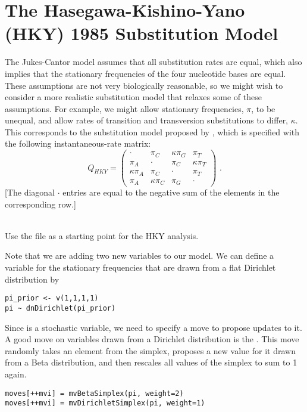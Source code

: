 \newpage
\section{The Hasegawa-Kishino-Yano (HKY) 1985 Substitution Model}

The Jukes-Cantor model assumes that all substitution rates are equal, which also implies that the stationary frequencies of the four nucleotide bases are equal.
These assumptions are not very biologically reasonable, so we might wish to consider a more realistic substitution model that relaxes some of these assumptions.
For example, we might allow stationary frequencies, $\pi$, to be unequal, and allow rates of transition and transversion substitutions to differ, $\kappa$.
This corresponds to the substitution model proposed by \citet[][HKY]{Hasegawa1985}, which is specified with the following instantaneous-rate matrix: 
\begin{equation*}
Q_{HKY} = \begin{pmatrix} 
{\cdot} 			& {\pi_C} 	& {\kappa\pi_G} 			& {\pi_T} \\ 
{\pi_A} 		& {\cdot} 			& {\pi_C} 			& {\kappa\pi_T} \\ 
{\kappa\pi_A} 			& {\pi_C} 			& {\cdot} 			& {\pi_T} \\ 
{\pi_A} 			& {\kappa\pi_C} 			& {\pi_G} 	& {\cdot}  
\end{pmatrix} \mbox{  .}
\end{equation*}
[The diagonal ${\cdot}$ entries are equal to the negative sum of the elements in the corresponding row.] 

\noindent \\ \impmark Use the file  as a starting point for the HKY analysis.

Note that we are adding two new variables to our model.
We can define a variable  for the stationary frequencies that are drawn from a flat Dirichlet distribution by
{\tt \begin{snugshade*}
\begin{lstlisting}
pi_prior <- v(1,1,1,1) 
pi ~ dnDirichlet(pi_prior)
\end{lstlisting}
\end{snugshade*}}
Since  is a stochastic variable, we need to specify a move to propose updates to it.
A good move on variables drawn from a Dirichlet distribution is the .
This move randomly takes an element from the simplex, proposes a new value for it drawn from a Beta distribution, and then rescales all values of the simplex to sum to 1 again.
{\tt \begin{snugshade*}
\begin{lstlisting}
moves[++mvi] = mvBetaSimplex(pi, weight=2)
moves[++mvi] = mvDirichletSimplex(pi, weight=1)
\end{lstlisting}
\end{snugshade*}}

